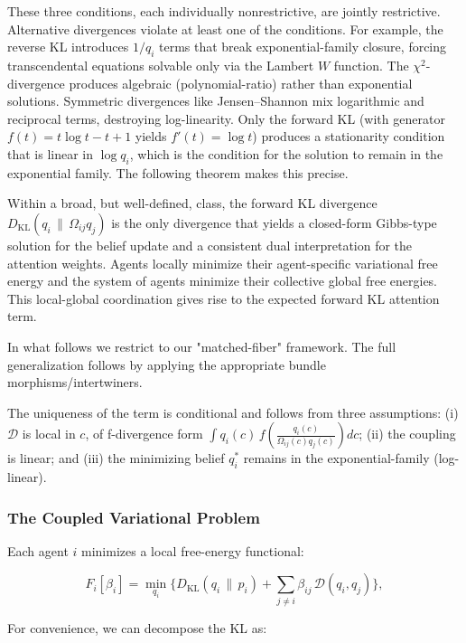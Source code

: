 \documentclass[twoside,11pt]{article}
\begin{document}
These three conditions, each individually nonrestrictive, are jointly restrictive.  Alternative divergences violate at least one of the conditions.  For example, the reverse KL introduces $1/q_i$ terms that break exponential-family closure, forcing transcendental equations solvable only via the Lambert $W$ function.  The $\chi^2$-divergence produces algebraic (polynomial-ratio) rather than exponential solutions.  Symmetric divergences like Jensen--Shannon mix logarithmic and reciprocal terms, destroying log-linearity.  Only the forward KL (with generator $f(t) = t\log t - t + 1$ yields $f'(t) = \log t$) produces a stationarity condition that is linear in $\log q_i$, which is the condition for the solution to remain in the exponential family.  The following theorem makes this precise.

Within a broad, but well-defined, class, the forward KL divergence $D_{\mathrm{KL}}(q_i \,\|\, \Omega_{ij} q_j)$ is the only divergence that yields a closed-form Gibbs-type solution for the belief update and a consistent dual interpretation for the attention weights.  Agents locally minimize their agent-specific variational free energy and the system of agents minimize their collective global free energies.  This local-global coordination gives rise to the expected forward KL attention term.

In what follows we restrict to our "matched-fiber" framework.  The full generalization follows by applying the appropriate bundle morphisms/intertwiners.

The uniqueness of the term is conditional and follows from three assumptions: (i) $\mathcal{D}$ is local in $c$, of f-divergence form $\displaystyle \int q_i(c)\, f\!\left(\frac{q_i(c)}{\Omega_{ij}(c) q_j(c)}\right) dc$; (ii) the coupling is linear; and (iii) the minimizing belief $q_i^*$ remains in the exponential-family (log-linear).

\subsubsection{The Coupled Variational Problem}

Each agent $i$ minimizes a local free-energy functional:

\begin{equation}
F_i[\beta_i]
=\min_{q_i}
\Big\{
D_{\mathrm{KL}}(q_i \,\|\, p_i)
+ \sum_{j\neq i} \beta_{ij}\,\mathcal{D}(q_i,q_j)
\Big\},
\label{eq:F_i}
\end{equation}

For convenience, we can decompose the KL as:
\end{document}
